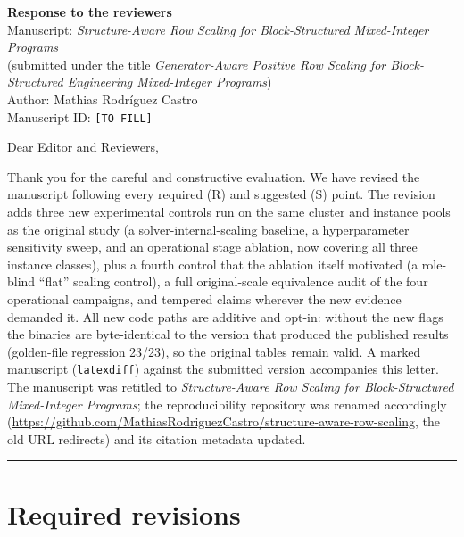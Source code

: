 \documentclass[11pt]{article}
\begin{document}
\begin{flushleft}
{\large\bfseries Response to the reviewers}\\[0.4em]
Manuscript: \emph{Structure-Aware Row Scaling for Block-Structured Mixed-Integer Programs}\\
(submitted under the title \emph{Generator-Aware Positive Row Scaling for Block-Structured
Engineering Mixed-Integer Programs})\\
Author: Mathias Rodr\'iguez Castro\\
Manuscript ID: \texttt{[TO FILL]}
\end{flushleft}

\noindent Dear Editor and Reviewers,

Thank you for the careful and constructive evaluation. We have revised the manuscript
following every required (R) and suggested (S) point. The revision adds three new
experimental controls run on the same cluster and instance pools as the original study
(a solver-internal-scaling baseline, a hyperparameter sensitivity sweep, and an
operational stage ablation, now covering all three instance classes), plus a fourth
control that the ablation itself motivated (a role-blind ``flat'' scaling control), a
full original-scale equivalence audit of the four operational campaigns, and tempered
claims wherever the new evidence demanded it. All new code paths are additive and opt-in:
without the new flags the binaries are byte-identical to the version that produced the
published results (golden-file regression 23/23), so the original tables remain valid.
A marked manuscript (\texttt{latexdiff}) against the submitted version accompanies this
letter. The manuscript was retitled to \emph{Structure-Aware Row Scaling for
Block-Structured Mixed-Integer Programs}; the reproducibility repository was renamed
accordingly (\url{https://github.com/MathiasRodriguezCastro/structure-aware-row-scaling},
the old URL redirects) and its citation metadata updated.

\bigskip
\hrule
\section*{Required revisions}
\end{document}
